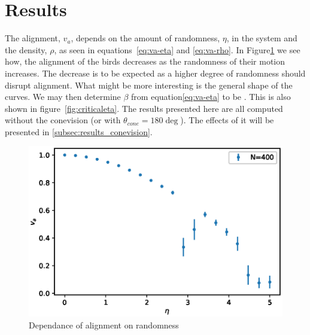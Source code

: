 \documentclass[twoside,twocolumn]{article}
\begin{document}
\section{Results}

The alignment, $v_a$, depends on the amount of randomness, $\eta$, in the system and the density, $\rho$, as seen in equations~\eqref{eq:va-eta} and \eqref{eq:va-rho}. In Figure\ref{fig:va_over_eta} we see how, the alignment of the birds decreases as the randomness of their motion increases. The decrease is to be expected as a higher degree of randomness should disrupt alignment. What might be more interesting is the general shape of the curves. We may then determine $\beta$ from equation\eqref{eq:va-eta} to be  . This is also shown in figure~\ref{fig:criticaleta}. The results presented here are all computed without the conevision (or with $\theta_{cone} = 180\deg$). The effects of it will be presented in \ref{subsec:results_conevision}.





\begin{figure}[!htb]
  \centering
  \includegraphics[width=\columnwidth]{va_over_eta}
  \caption{Dependance of alignment on randomness}
  \label{fig:va_over_eta}
\end{figure}
\end{document}
